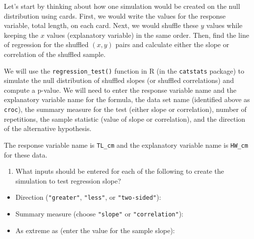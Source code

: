\documentclass[
]{report}
\providecommand{\tightlist}{%
  \setlength{\itemsep}{0pt}\setlength{\parskip}{0pt}}
\begin{document}
Let's start by thinking about how one simulation would be created on the null distribution using cards. First, we would write the values for the response variable, total length, on each card. Next, we would shuffle these \(y\) values while keeping the \(x\) values (explanatory variable) in the same order. Then, find the line of regression for the shuffled \((x,y)\) pairs and calculate either the slope or correlation of the shuffled sample.

We will use the \texttt{regression\_test()} function in R (in the \texttt{catstats} package) to simulate the null distribution of shuffled slopes (or shuffled correlations) and compute a p-value. We will need to enter the response variable name and the explanatory variable name for the formula, the data set name (identified above as \texttt{croc}), the summary measure for the test (either slope or correlation), number of repetitions, the sample statistic (value of slope or correlation), and the direction of the alternative hypothesis.

\newpage

The response variable name is \texttt{TL\_cm} and the explanatory variable name is \texttt{HW\_cm} for these data.

\begin{enumerate}
\def\labelenumi{\arabic{enumi}.}
\setcounter{enumi}{7}
\tightlist
\item
  What inputs should be entered for each of the following to create the simulation to test regression slope?
\end{enumerate}

\vspace{.5mm}

\begin{itemize}
\tightlist
\item
  Direction (\texttt{"greater"}, \texttt{"less"}, or \texttt{"two-sided"}):
\end{itemize}

\vspace{.2in}

\begin{itemize}
\tightlist
\item
  Summary measure (choose \texttt{"slope"} or \texttt{"correlation"}):
\end{itemize}

\vspace{.2in}

\begin{itemize}
\tightlist
\item
  As extreme as (enter the value for the sample slope):
\end{itemize}
\end{document}
